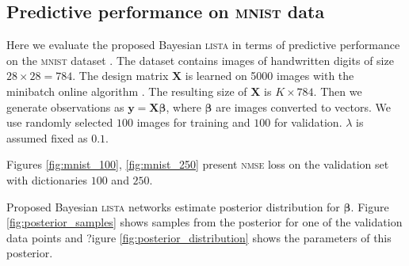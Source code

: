 \documentclass[letterpaper]{article}
\begin{document}

\subsection{Predictive performance on \textsc{mnist} data}
Here we evaluate the proposed Bayesian \textsc{lista} in terms of predictive performance on the \textsc{mnist} dataset \citep{lecun1998gradient}. The dataset contains images of handwritten digits of size $28 \times 28 = 784$. The design matrix $\mathbf{X}$ is learned on 5000 images with the minibatch online algorithm \citep{mairal2009online}. The resulting size of $\mathbf{X}$ is $K \times 784$. Then we generate observations as $\mathbf{y} = \mathbf{X}\boldsymbol\beta$, where $\boldsymbol\beta$ are images converted to vectors. We use randomly selected $100$ images for training and $100$ for validation. $\lambda$ is assumed fixed as $0.1$.

Figures \ref{fig:mnist_100}, \ref{fig:mnist_250} present \textsc{nmse} loss on the validation set with dictionaries $100$ and $250$. 

Proposed Bayesian \textsc{lista} networks estimate posterior distribution for $\boldsymbol\beta$. Figure \ref{fig:posterior_samples} shows samples from the posterior for one of the validation data points and ?igure \ref{fig:posterior_distribution} shows the parameters of this posterior.
\end{document}
